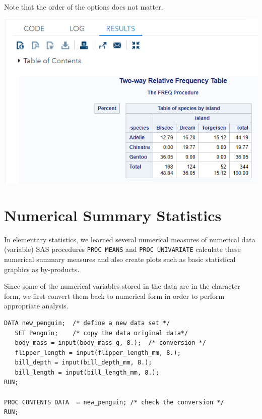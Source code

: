 \documentclass[
]{book}
\begin{document}
Note that the order of the options does not matter.

\begin{center}\includegraphics[width=1\linewidth]{img05/w05-2wayFreqRelTable} \end{center}

\hypertarget{numerical-summary-statistics}{%
\section{Numerical Summary Statistics}\label{numerical-summary-statistics}}

In elementary statistics, we learned several numerical measures of numerical data (variable) SAS procedures \texttt{PROC\ MEANS} and \texttt{PROC\ UNIVARIATE} calculate these numerical summary measures and also create plots such as basic statistical graphics as by-products.

Since some of the numerical variables stored in the data are in the character form, we first convert them back to numerical form in order to perform appropriate analysis.

\begin{verbatim}
DATA new_penguin;  /* define a new data set */
   SET Penguin;    /* copy the data original data*/
   body_mass = input(body_mass_g, 8.);  /* conversion */
   flipper_length = input(flipper_length_mm, 8.);
   bill_depth = input(bill_depth_mm, 8.);
   bill_length = input(bill_length_mm, 8.);
RUN;

PROC CONTENTS DATA  = new_penguin; /* check the conversion */
RUN;
\end{verbatim}
\end{document}
